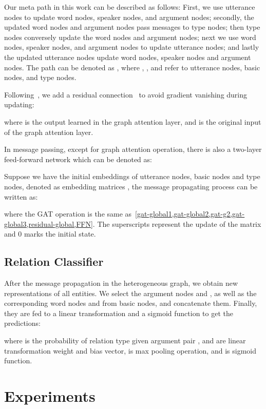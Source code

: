 \documentclass[11pt]{article}
\begin{document}
Our meta path in this work can be described as follows:
First, we use utterance nodes to update word nodes, speaker nodes, and argument nodes; secondly, the updated word nodes and argument nodes pass messages to type nodes; then type nodes conversely update the word nodes and argument nodes; next we use word nodes, speaker nodes, and argument nodes to update utterance nodes; and lastly the updated utterance nodes update word nodes, speaker nodes and argument nodes. The path can be denoted as , where , , and  refer to utterance nodes, basic nodes, and type nodes.

Following~\citet{wang2020heterogeneous}, we add a residual connection~\cite{he2016deep} to avoid gradient vanishing during updating:


where  is the output learned in the graph attention layer, and  is the original input of the graph attention layer.

In message passing, except for graph attention operation, there is also a two-layer feed-forward network which can be denoted as:


Suppose we have the initial embeddings of utterance nodes, basic nodes and type nodes, denoted as embedding matrices , the message propagating process can be written as:


where the GAT operation is the same as~\cref{gat-global1,gat-global2,gat-g2,gat-global3,residual-global,FFN}. The superscripts represent the  update of the matrix and 0 marks the initial state.

\subsection{Relation Classifier}
After the message propagation in the heterogeneous graph, we obtain new representations of all entities. We select the argument nodes  and , as well as the corresponding word nodes  and  from basic nodes, and concatenate them. Finally, they are fed to a linear transformation and a sigmoid function to get the predictions:

where  is the probability of relation type  given argument pair ,  and  are linear transformation weight and bias vector,  is max pooling operation, and  is sigmoid function.

\section{Experiments}
\label{experiment}
\end{document}

